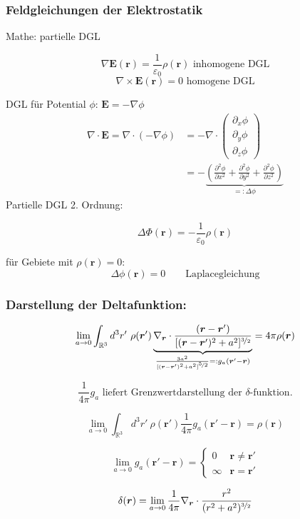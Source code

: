 \documentclass[titlepage,11pt,a4paper,ngerman]{report}
\renewcommand{\Phi}{\varPhi}
\renewcommand{\vec}[1]{\boldsymbol{#1}}
\renewcommand{\epsilon}{\varepsilon}
\renewcommand{\paragraph}[1]{\subsubsection{#1}}
\newcommand{\frbox}[2]{\begin{tcolorbox}[colback=white,colframe=red!75!black,fonttitle=\bfseries,title=#1]#2\end{tcolorbox}}
\newcommand{\rbox}[1]{\begin{tcolorbox}[colback=white,colframe=red!75!black]#1\end{tcolorbox}}
\begin{document}
\paragraph{Feldgleichungen der Elektrostatik}
Mathe: partielle DGL
\rbox{$$\nabla \vec{E}(\vec{r}) = \frac{1}{\epsilon_0} \rho(\vec{r}) \textrm{ inhomogene DGL}$$ 
	$$\nabla \times \vec{E}(\vec{r}) = 0\textrm{ homogene DGL}$$}
\noindent
DGL für Potential $\phi$: 
$\vec{E} = - \nabla \phi$
\begin{align*}\nabla \cdot \vec{E} = \nabla \cdot (- \nabla \phi) &= - \nabla \cdot \begin{pmatrix} 
\partial_x \phi \\
\partial_y \phi \\ 
\partial_z \phi 
\end{pmatrix} \\
&= - \underbrace{\left( \frac{\partial^2 \phi}{\partial x^2} + \frac{\partial^2 \phi}{\partial y^2} + \frac{\partial^2 \phi}{\partial  z^2} \right) }_{=: \Delta \phi}\end{align*}
Partielle DGL 2. Ordnung:
\frbox{Poissongleichung}{$$\Delta \Phi(\vec{r}) = - \frac{1}{\epsilon_0} \rho(\vec{r})$$}
\noindent
für Gebiete mit $\rho (\vec{r}) = 0$:
$$\Delta \phi (\vec{r}) = 0 \qquad \textrm{Laplacegleichung}$$

\paragraph{Darstellung der Deltafunktion:}

$$\lim_{a \to 0} \int_{\mathbb{R}^3} d^3r'\ \rho(\vec{r}')\underbrace{\nabla_{\vec{r}} \cdot \frac{(\vec{r} - \vec{r}')}{[(\vec{r} - \vec{r}')^2 + a^2]^{\nicefrac{3}{2}}}}_{\frac{3 a^2}{[(\vec{r} - \vec{r}')^2 + a^2]^{\nicefrac{5}{2}}} =: g_a(\vec{r}' - \vec{r})} = 4 \pi \rho(\vec{r})$$

$$\frac{1}{4 \pi} g_a \textrm{ liefert Grenzwertdarstellung der $\delta$-funktion.}$$

$$\lim_{a\to 0} \int_{\mathbb{R}^3} d^3r'\ \rho(\vec{r}') \frac{1}{4\pi}g_a(\vec{r}'-\vec{r})=\rho(\vec{r})$$

$$\lim_{a \to 0} g_a(\vec{r}' - \vec{r}) = \left\{ \begin{array}{cc}
0 		& \vec{r} \neq  \vec{r}'\\
\infty 	& \vec{r} = 	\vec{r}'
\end{array} \right.$$

$$\delta(\vec{r}) = \lim_{a \to 0} \frac{1}{4 \pi} \nabla_{\vec{r}} \cdot \frac{r^2}{(r^2+a^2)^{\nicefrac{3}{2}}}$$
\end{document}
